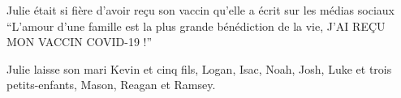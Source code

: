 Julie était si fière d'avoir reçu son vaccin qu'elle a écrit sur les médias
sociaux “L'amour d'une famille est la plus grande bénédiction de la vie, J'AI
REÇU MON VACCIN COVID-19 !”

Julie laisse son mari Kevin et cinq fils, Logan, Isac, Noah, Josh, Luke et trois
petits-enfants, Mason, Reagan et Ramsey.

